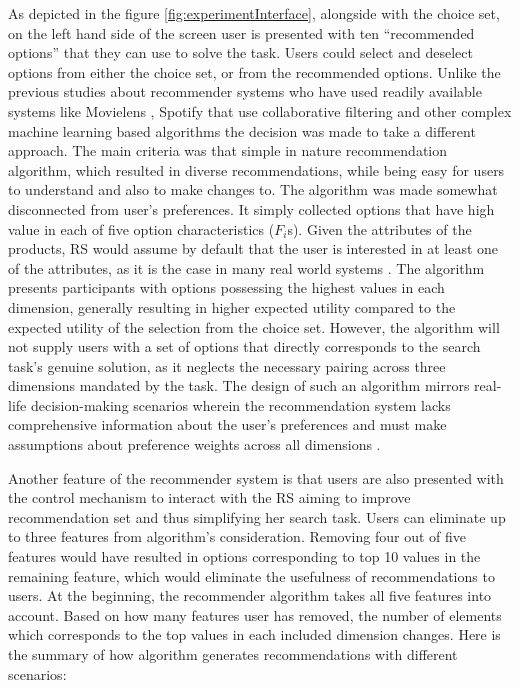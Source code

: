 \documentclass[a4paper,12pt]{article}
\begin{document}
As depicted in the figure \ref{fig:experimentInterface}, alongside with the choice set, on the left hand side of the screen user is presented with ten ``recommended options'' that they can use to solve the task. Users could select and deselect options from either the choice set, or from the recommended options. Unlike the previous studies about recommender systems who have used readily available systems like Movielens \citep{movielens2018}, Spotify \citep{millecampControllingSpotifyRecommendations2018} that use collaborative filtering and other complex machine learning based algorithms the decision was made  to take a different approach. The main criteria was that simple in nature recommendation algorithm, which resulted in diverse recommendations, while being easy for users to understand and also to make changes to. The algorithm was made somewhat disconnected from user's preferences. It simply collected options that have high value in each of five option characteristics ($F_i$s). Given the attributes of the products, RS would assume by default that the user is interested in at least one of the attributes, as it is the case in many real world systems \citep{guAddressingColdStartProblem2019}. The algorithm presents participants with options possessing the highest values in each dimension, generally resulting in higher expected utility compared to the expected utility of the selection from the choice set. However, the algorithm will not supply users with a set of options that directly corresponds to the search task's genuine solution, as it neglects the necessary pairing across three dimensions mandated by the task. The design of such an algorithm mirrors real-life decision-making scenarios wherein the recommendation system lacks comprehensive information about the user's preferences and must make assumptions about preference weights across all dimensions \citep{scheinMethodsMetricsColdStart}.

Another feature of the recommender system is that users are also presented with the control mechanism to interact with the RS aiming to improve recommendation set and thus simplifying her search task. Users can eliminate up to three features from algorithm's consideration. Removing four out of five features would have resulted in options corresponding to top 10 values in the remaining feature, which would eliminate the usefulness of recommendations to users. At the beginning, the recommender algorithm takes all five features into account. Based on how many features user has removed, the number of elements which corresponds to the top values in each included dimension changes. Here is the summary of how algorithm generates recommendations with different scenarios:
\end{document}
